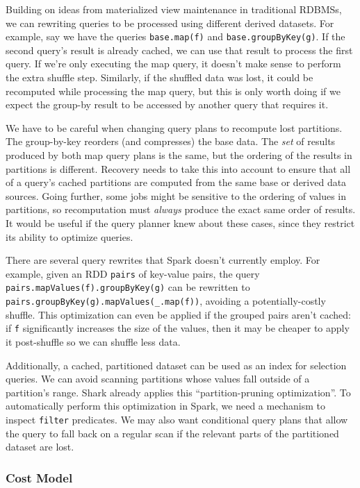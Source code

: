 \documentclass[12pt]{article}
\begin{document}
Building on ideas from materialized view maintenance in traditional RDBMSs, we
can rewriting queries to be processed using different derived datasets.  For
example, say we have the queries \texttt{base.map(f)} and
\texttt{base.groupByKey(g)}.  If the second query's result is already cached,
we can use that result to process the first query.  If we're only executing
the map query, it doesn't make sense to perform the extra shuffle step.
Similarly, if the shuffled data was lost, it could be recomputed while
processing the map query, but this is only worth doing if we expect the
group-by result to be accessed by another query that requires it.

We have to be careful when changing query plans to recompute lost partitions.
The group-by-key reorders (and compresses) the base data.  The \emph{set} of
results produced by both map query plans is the same, but the ordering of the
results in partitions is different.  Recovery needs to take this into account
to ensure that all of a query's cached partitions are computed from the same
base or derived data sources.  Going further, some jobs might be sensitive to
the ordering of values in partitions, so recomputation must \emph{always}
produce the exact same order of results.  It would be useful if the query
planner knew about these cases, since they restrict its ability to optimize
queries.

There are several query rewrites that Spark doesn't currently employ.  For example, given an RDD \texttt{pairs} of key-value pairs, the query
\texttt{pairs.mapValues(f).groupByKey(g)} can be rewritten to
\texttt{pairs.groupByKey(g).mapValues(\_.map(f))}, avoiding
a potentially-costly shuffle.  This optimization can even be applied if the
grouped pairs aren't cached: if \texttt{f} significantly increases the size of
the values, then it may be cheaper to apply it post-shuffle so we can shuffle
less data.

Additionally, a cached, partitioned dataset can be used as an index for
selection queries.  We can avoid scanning partitions whose values fall outside
of a partition's range.  Shark already applies this ``partition-pruning
optimization''.  To automatically perform this optimization in Spark, we need
a mechanism to inspect \texttt{filter} predicates.  We may also want
conditional query plans that allow the query to fall back on a regular scan if
the relevant parts of the partitioned dataset are lost.

\subsubsection{Cost Model}
\end{document}
